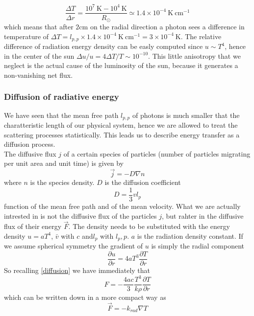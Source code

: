 \documentclass[11pt]{article}
\numberwithin{equation}{section}
\begin{document}
$$
\frac{\Delta T}{\Delta r} = \frac{10^7 \ \mathrm{K}-10^4  \ \mathrm{K}}{R_{\odot}} \simeq 1.4 \times 10^{-4} \  \mathrm{K} \ \mathrm{cm} ^{-1}
$$
which means that after $2 \mathrm{cm}$ on the radial direction a photon sees a difference in temperature of $\Delta T = l_{p,p} \times 1.4 \times 10^{-4}  \  \mathrm{K} \ \mathrm{cm} ^{-1}= 3 \times 10^{-4} \  \mathrm{K}$. The relative difference of radiation energy density can be easly computed since $u \sim T^4$, hence in the center of the sun $\Delta u/u=4 \Delta T / T \sim 10^{-10}$. This little anisotropy that we neglect is the actual cause of the luminosity of the sun, because it generates a non-vanishing net flux.
\subsubsection{Diffusion of radiative energy}
We have seen that the mean free path $l_{p,p}$ of photons is much smaller that the charatteristic length of our physical system, hence we are allowed to treat the scattering processes statistically. This leads us to describe energy transfer as a diffusion process. \\
The diffusive flux $j$ of a certain species of particles (number of particles migrating per unit area and unit time) is given by
\begin{equation}\label{diffusion}
	\vec  j=-D \nabla n
\end{equation}
where $n$ is the species density. $D$ is the diffusion coefficient
\begin{equation}
	D =\frac{1}{3} v l_{p}
\end{equation}
function of the mean free path and of the mean velocity. What we are actually intrested in is not the diffusive flux of the particles $j$, but rahter in the diffusive flux of their energy $\vec F$. The density needs to be substituted with the energy density $u=aT^4$, $\bar v$ with $c$ and$l_p$ with $l_p,p$. $a$ is the radiation density constant. If we assume spherical symmetry the gradient of $u$ is simply the radial component
\begin{equation}
	\frac{\partial u}{\partial r} = 4  a  T^3   \frac{\partial T}{\partial r}
\end{equation}
So recalling \ref{diffusion} we have immediately that
\begin{equation}
	F=-\frac{4ac}{3}\frac{T^3}{k \rho} \frac{\partial T}{\partial r}
\end{equation}
which can be written down in a more compact way as 
\begin{equation}
	\vec F = - k_{rad} \nabla T
\end{equation}
\end{document}

